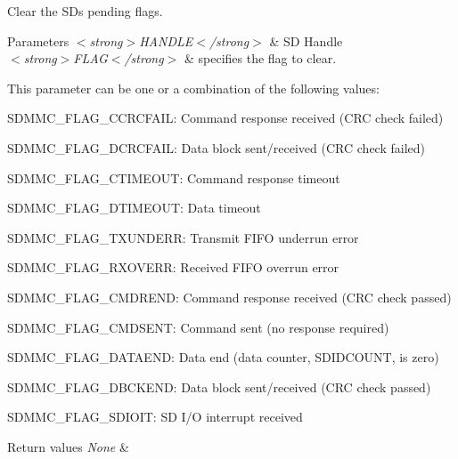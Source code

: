 Clear the SD\textquotesingle{}s pending flags. 


\begin{DoxyParams}{Parameters}
{\em $<$strong$>$\+H\+A\+N\+D\+L\+E$<$/strong$>$} & SD Handle\\
\hline
{\em $<$strong$>$\+F\+L\+A\+G$<$/strong$>$} & specifies the flag to clear.\\
\hline
\end{DoxyParams}
This parameter can be one or a combination of the following values\+: \begin{DoxyItemize}
\item S\+D\+M\+M\+C\+\_\+\+F\+L\+A\+G\+\_\+\+C\+C\+R\+C\+F\+A\+IL\+: Command response received (C\+RC check failed) \item S\+D\+M\+M\+C\+\_\+\+F\+L\+A\+G\+\_\+\+D\+C\+R\+C\+F\+A\+IL\+: Data block sent/received (C\+RC check failed) \item S\+D\+M\+M\+C\+\_\+\+F\+L\+A\+G\+\_\+\+C\+T\+I\+M\+E\+O\+UT\+: Command response timeout \item S\+D\+M\+M\+C\+\_\+\+F\+L\+A\+G\+\_\+\+D\+T\+I\+M\+E\+O\+UT\+: Data timeout \item S\+D\+M\+M\+C\+\_\+\+F\+L\+A\+G\+\_\+\+T\+X\+U\+N\+D\+E\+RR\+: Transmit F\+I\+FO underrun error \item S\+D\+M\+M\+C\+\_\+\+F\+L\+A\+G\+\_\+\+R\+X\+O\+V\+E\+RR\+: Received F\+I\+FO overrun error \item S\+D\+M\+M\+C\+\_\+\+F\+L\+A\+G\+\_\+\+C\+M\+D\+R\+E\+ND\+: Command response received (C\+RC check passed) \item S\+D\+M\+M\+C\+\_\+\+F\+L\+A\+G\+\_\+\+C\+M\+D\+S\+E\+NT\+: Command sent (no response required) \item S\+D\+M\+M\+C\+\_\+\+F\+L\+A\+G\+\_\+\+D\+A\+T\+A\+E\+ND\+: Data end (data counter, S\+D\+I\+D\+C\+O\+U\+NT, is zero) \item S\+D\+M\+M\+C\+\_\+\+F\+L\+A\+G\+\_\+\+D\+B\+C\+K\+E\+ND\+: Data block sent/received (C\+RC check passed) \item S\+D\+M\+M\+C\+\_\+\+F\+L\+A\+G\+\_\+\+S\+D\+I\+O\+IT\+: SD I/O interrupt received 
\begin{DoxyRetVals}{Return values}
{\em None} & \\
\hline
\end{DoxyRetVals}
\end{DoxyItemize}
\mbox{\label{group___s_d___exported__macros_ga80f2ae25047298cbcec8226bd23dc02e}} 
